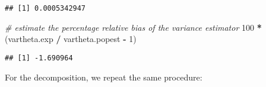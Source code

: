 \documentclass[
]{book}
\newenvironment{Shaded}{\begin{snugshade}}{\end{snugshade}}
\newcommand{\CommentTok}[1]{\textcolor[rgb]{0.56,0.35,0.01}{\textit{#1}}}
\newcommand{\DecValTok}[1]{\textcolor[rgb]{0.00,0.00,0.81}{#1}}
\newcommand{\NormalTok}[1]{#1}
\newcommand{\SpecialCharTok}[1]{\textcolor[rgb]{0.81,0.36,0.00}{\textbf{#1}}}
\begin{document}
\begin{verbatim}
## [1] 0.0005342947
\end{verbatim}

\begin{Shaded}
\begin{Highlighting}[]
\CommentTok{\# estimate the percentage relative bias of the variance estimator}
\DecValTok{100} \SpecialCharTok{*}\NormalTok{ (vartheta.exp }\SpecialCharTok{/}\NormalTok{ vartheta.popest }\SpecialCharTok{{-}} \DecValTok{1}\NormalTok{)}
\end{Highlighting}
\end{Shaded}

\begin{verbatim}
## [1] -1.690964
\end{verbatim}

For the decomposition, we repeat the same procedure:
\end{document}
